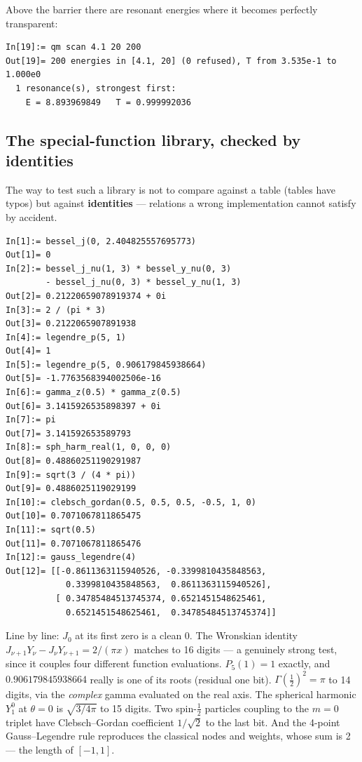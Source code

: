 \documentclass[11pt]{article}
\begin{document}
Above the barrier there are resonant energies where it becomes
perfectly transparent:

\begin{lstlisting}
In[19]:= qm scan 4.1 20 200
Out[19]= 200 energies in [4.1, 20] (0 refused), T from 3.535e-1 to 1.000e0
  1 resonance(s), strongest first:
    E = 8.893969849   T = 0.999992036
\end{lstlisting}

\subsection{The special-function library, checked by identities}

The way to test such a library is not to compare against a table (tables
have typos) but against \textbf{identities} --- relations a wrong
implementation cannot satisfy by accident.

\begin{lstlisting}
In[1]:= bessel_j(0, 2.404825557695773)
Out[1]= 0
In[2]:= bessel_j_nu(1, 3) * bessel_y_nu(0, 3)
        - bessel_j_nu(0, 3) * bessel_y_nu(1, 3)
Out[2]= 0.21220659078919374 + 0i
In[3]:= 2 / (pi * 3)
Out[3]= 0.2122065907891938
In[4]:= legendre_p(5, 1)
Out[4]= 1
In[5]:= legendre_p(5, 0.906179845938664)
Out[5]= -1.7763568394002506e-16
In[6]:= gamma_z(0.5) * gamma_z(0.5)
Out[6]= 3.1415926535898397 + 0i
In[7]:= pi
Out[7]= 3.141592653589793
In[8]:= sph_harm_real(1, 0, 0, 0)
Out[8]= 0.48860251190291987
In[9]:= sqrt(3 / (4 * pi))
Out[9]= 0.4886025119029199
In[10]:= clebsch_gordan(0.5, 0.5, 0.5, -0.5, 1, 0)
Out[10]= 0.7071067811865475
In[11]:= sqrt(0.5)
Out[11]= 0.7071067811865476
In[12]:= gauss_legendre(4)
Out[12]= [[-0.8611363115940526, -0.3399810435848563,
            0.3399810435848563,  0.8611363115940526],
          [ 0.34785484513745374, 0.6521451548625461,
            0.6521451548625461,  0.34785484513745374]]
\end{lstlisting}

Line by line: $J_0$ at its first zero is a clean 0. The Wronskian
identity $J_{\nu+1}Y_\nu - J_\nu Y_{\nu+1} = 2/(\pi x)$ matches to 16
digits --- a genuinely strong test, since it couples four different
function evaluations. $P_5(1)=1$ exactly, and $0.906179845938664$ really
is one of its roots (residual one bit). $\Gamma(\tfrac12)^2 = \pi$ to 14
digits, via the \emph{complex} gamma evaluated on the real axis. The
spherical harmonic $Y_1^0$ at $\theta=0$ is $\sqrt{3/4\pi}$ to 15
digits. Two spin-$\tfrac12$ particles coupling to the $m=0$ triplet have
Clebsch--Gordan coefficient $1/\sqrt2$ to the last bit. And the 4-point
Gauss--Legendre rule reproduces the classical nodes and weights, whose
sum is 2 --- the length of $[-1,1]$.
\end{document}
